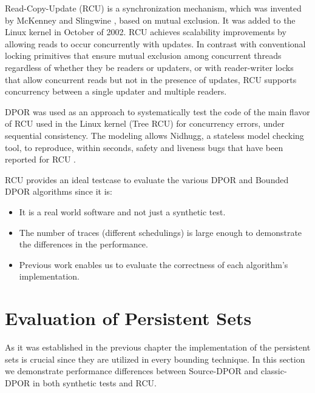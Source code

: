 Read-Copy-Update (RCU) is a synchronization mechanism, which was invented by McKenney and Slingwine \cite{McKenney98}, based on mutual exclusion.
It was added to the Linux kernel in October of 2002. RCU achieves scalability improvements by allowing reads to occur concurrently 
with updates. In contrast with conventional locking primitives that ensure mutual exclusion among concurrent threads regardless of whether 
they be readers or updaters, or with reader-writer locks that allow concurrent reads but not in the presence of updates, 
RCU supports concurrency between a single updater and multiple readers. 

DPOR was used as an approach to systematically test the code
of the main flavor of RCU used in the Linux kernel (Tree RCU) for
concurrency errors, under sequential consistency. 
The modeling allows Nidhugg, a stateless model checking
tool, to reproduce, within seconds, safety and liveness bugs that
have been reported for RCU \cite{Spin}.

RCU provides an ideal testcase to evaluate the various DPOR and Bounded DPOR algorithms since it is:
\begin{itemize}
\item It is a real world software and not just a synthetic test.
\item The number of traces (different schedulings) is large enough to demonstrate the differences in the performance.
\item Previous work \cite{Spin} enables us to evaluate the correctness of each algorithm's implementation.
\end{itemize}


\section{Evaluation of Persistent Sets}
As it was established in the previous chapter the implementation of the persistent sets
is crucial since they are utilized in every bounding technique. 
In this section we demonstrate performance differences between Source-DPOR and classic-DPOR in both synthetic tests and RCU.

